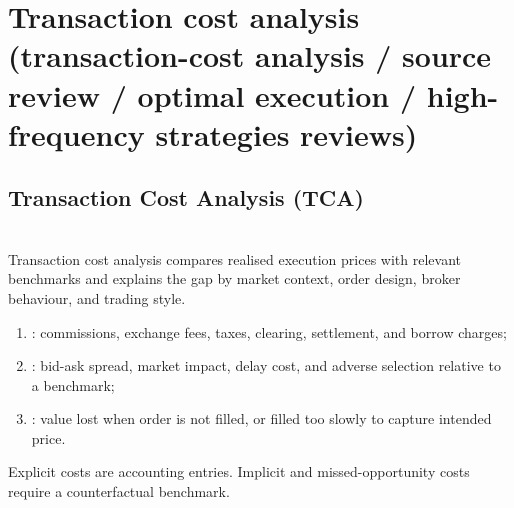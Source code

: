 \documentclass[a4paper,oneside,openany]{book}
\begin{document}
\section*{Transaction cost analysis (transaction-cost analysis / source review / optimal execution / high-frequency strategies reviews)}

\subsection*{Transaction Cost Analysis (TCA)}

\begin{definition} \\
Transaction cost analysis compares realised execution prices with relevant benchmarks and explains the gap by market context, order design, broker behaviour, and trading style.
\end{definition}

\begin{taxonomy} 
\begin{enumerate}[label=\roman*.]
\setlength{\itemsep}{0pt}
\item {}: commissions, exchange fees, taxes, clearing, settlement, and borrow charges;
\item {}: bid-ask spread, market impact, delay cost, and adverse selection relative to a benchmark;
\item {}: value lost when order is not filled, or filled too slowly to capture intended price.
\end{enumerate}
Explicit costs are accounting entries. Implicit and missed-opportunity costs require a counterfactual benchmark.
\end{taxonomy}
\end{document}
